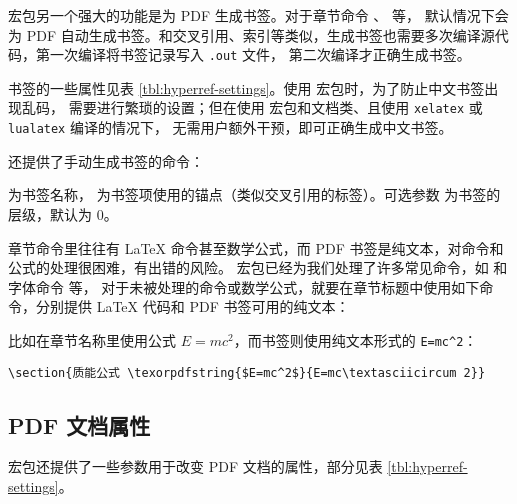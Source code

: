  宏包另一个强大的功能是为 PDF 生成书签。对于章节命令 、 等，
默认情况下会为 PDF 自动生成书签。和交叉引用、索引等类似，生成书签也需要多次编译源代码，第一次编译将书签记录写入 \texttt{.out} 文件，
第二次编译才正确生成书签。

书签的一些属性见表 \ref{tbl:hyperref-settings}。使用  宏包时，为了防止中文书签出现乱码，
需要进行繁琐的设置；但在使用  宏包和文档类、且使用 \texttt{xelatex} 或 \texttt{lualatex} 编译的情况下，
无需用户额外干预，即可正确生成中文书签。

 还提供了手动生成书签的命令：
\begin{command}
\end{command}
 为书签名称， 为书签项使用的锚点（类似交叉引用的标签）。可选参数  为书签的层级，默认为 0。

章节命令里往往有 \LaTeX{} 命令甚至数学公式，而 PDF 书签是纯文本，对命令和公式的处理很困难，有出错的风险。
 宏包已经为我们处理了许多常见命令，如  和字体命令  等，
对于未被处理的命令或数学公式，就要在章节标题中使用如下命令，分别提供 \LaTeX{} 代码和 PDF 书签可用的纯文本：
\begin{command}
\end{command}
比如在章节名称里使用公式 $E=mc^2$，而书签则使用纯文本形式的 \verb|E=mc^2|：
\begin{verbatim}
\section{质能公式 \texorpdfstring{$E=mc^2$}{E=mc\textasciicircum 2}}
\end{verbatim}

\subsection{PDF 文档属性}\label{subsec:pdf-settings}

 宏包还提供了一些参数用于改变 PDF 文档的属性，部分见表 \ref{tbl:hyperref-settings}。


\endinput
